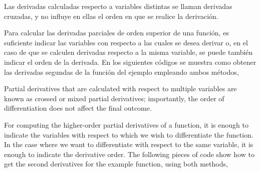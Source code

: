 \begin{paracol}{2}
Las derivadas calculadas respecto a variables distintas se llaman derivadas cruzadas, y no influye en ellas el orden en que se realice la derivación.
 
Para calcular las derivadas parciales de orden superior de una función, es suficiente indicar las variables con respecto a las cuales se desea derivar o, en el caso de que se calculen derivadas respecto a la misma variable, se puede también indicar el orden de la derivada. En los siguientes códigos se muestra como obtener las derivadas segundas de la función del ejemplo empleando ambos métodos,

\switchcolumn
Partial derivatives that are calculated with respect to multiple variables are known as crossed or mixed partial derivatives; importantly, the order of differentiation does not affect the final outcome.

For computing the higher-order partial derivatives of a function, it is enough to indicate the variables with respect to which we wish to differentiate the function. In the case where we want to differentiate with respect to the same variable, it is enough to indicate the derivative order. The following pieces of code show how to get the second derivatives for the example function, using both methods,
  
\end{paracol}
